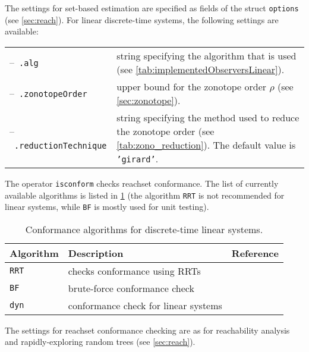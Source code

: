 The settings for set-based estimation are specified as fields of the struct \texttt{options} (see \cref{sec:reach}). For linear discrete-time systems, the following settings are available:

\begin{center}
\renewcommand{\arraystretch}{1.3}
\begin{tabular}[t]{l p{11cm}}	
    --~\texttt{.alg} & string specifying the algorithm that is used (see \cref{tab:implementedObserversLinear}). \\
	--~\texttt{.zonotopeOrder} & upper bound for the zonotope order $\rho$ (see \cref{sec:zonotope}). \\
	--~\texttt{.reductionTechnique} & string specifying the method used to reduce the zonotope order (see \cref{tab:zono_reduction}). The default value is \texttt{'girard'}.
\end{tabular}
\end{center}



The operator \texttt{isconform} checks reachset conformance. The list of currently available algorithms is listed in \cref{tab:linAlgConform} (the algorithm \texttt{RRT} is not recommended for linear systems, while \texttt{BF} is mostly used for unit testing).

\begin{table}[h]
	\caption{Conformance algorithms for discrete-time linear systems.}
	\centering
	\label{tab:linAlgConform}
	\begin{tabular}{lll}
		\toprule
		\textbf{Algorithm} & \textbf{Description} & \textbf{Reference} \\
		\midrule
		\texttt{RRT} & checks conformance using RRTs & \cite{Althoff2012b} \\
		\texttt{BF} & brute-force conformance check & \cite{Roehm2016} \\
		\texttt{dyn} & conformance check for linear systems & \cite{Liu2023,Althoff2023a} \\
		\bottomrule
	\end{tabular}
\end{table}

The settings for reachset conformance checking are as for reachability analysis and rapidly-exploring random trees (see \cref{sec:reach}).
